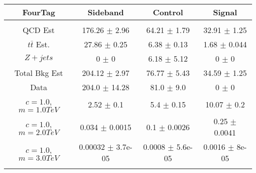 \begin{footnotesize} 
\begin{tabular}{c|c|c|c} 
FourTag & Sideband & Control & Signal \\ 
\hline\hline 
& & & \\ 
QCD Est & 176.26 $\pm$ 2.96 & 64.21 $\pm$ 1.79 & 32.91 $\pm$ 1.25\\ 
$t\bar{t}$ Est.  & 27.86 $\pm$ 0.25 & 6.38 $\pm$ 0.13 & 1.68 $\pm$ 0.044\\ 
$Z+jets$ & 0 $\pm$ 0 & 6.18 $\pm$ 5.12 & 0 $\pm$ 0\\ 
Total Bkg Est & 204.12 $\pm$ 2.97 & 76.77 $\pm$ 5.43 & 34.59 $\pm$ 1.25\\ 
Data & 204.0 $\pm$ 14.28 & 81.0 $\pm$ 9.0 & 0 $\pm$ 0\\ 
$c=1.0$,$m=1.0TeV$ & 2.52 $\pm$ 0.1 & 5.4 $\pm$ 0.15 & 10.07 $\pm$ 0.2\\ 
$c=1.0$,$m=2.0TeV$ & 0.034 $\pm$ 0.0015 & 0.1 $\pm$ 0.0026 & 0.25 $\pm$ 0.0041\\ 
$c=1.0$,$m=3.0TeV$ & 0.00032 $\pm$ 3.7e-05 & 0.0008 $\pm$ 5.6e-05 & 0.0016 $\pm$ 8e-05\\ 
& & & \\ 
\hline\hline 
\end{tabular} 
\end{footnotesize} 
\newline 
